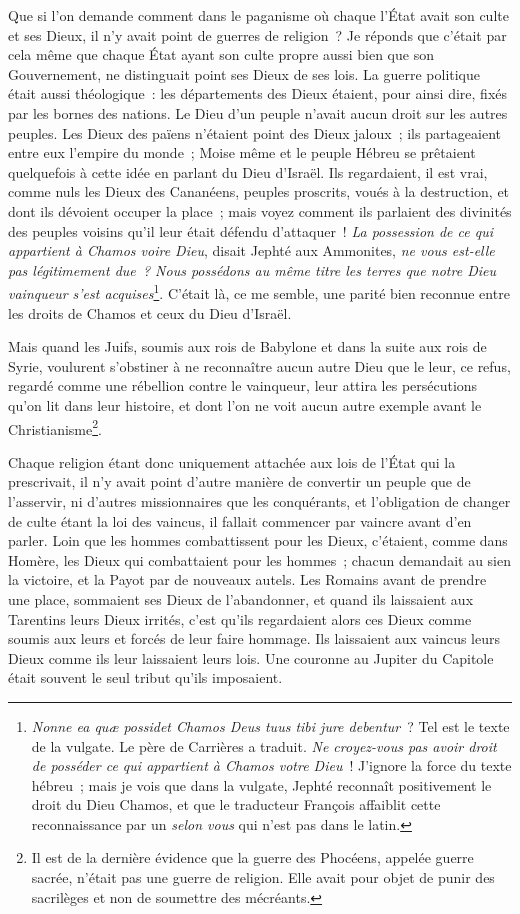 \documentclass[french,twoside]{book} %
\begin{document}
Que si l’on demande comment dans le paganisme où chaque l’État avait son culte et ses Dieux, il n’y avait point de guerres de religion ? Je réponds que c’était par cela même que chaque État ayant son culte propre aussi bien que son Gouvernement, ne distinguait point ses Dieux de ses lois. La guerre politique était aussi théologique : les départements des Dieux étaient, pour ainsi dire, fixés par les bornes des nations. Le Dieu d’un peuple n’avait aucun droit sur les autres peuples. Les Dieux des païens n’étaient point des Dieux jaloux ; ils partageaient entre eux l’empire du monde ; Moise même et le peuple Hébreu se prêtaient quelquefois à cette idée en parlant du Dieu d’Israël. Ils regardaient, il est vrai, comme nuls les Dieux des Cananéens, peuples proscrits, voués à la destruction, et dont ils dévoient occuper la place ; mais voyez comment ils parlaient des divinités des peuples voisins qu’il leur était défendu d’attaquer ! {\itshape La possession de ce qui appartient à Chamos voire Dieu}, disait Jephté aux Ammonites, {\itshape ne vous est-elle pas légitimement due ? Nous possédons au même titre les terres que notre Dieu vainqueur s’est acquises}\footnote{{\itshape Nonne ea quæ possidet Chamos Deus tuus tibi jure debentur} ? Tel est le texte de la vulgate. Le père de Carrières a traduit. {\itshape Ne croyez-vous pas avoir droit de posséder ce qui appartient à Chamos votre Dieu} ! J’ignore la force du texte hébreu ; mais je vois que dans la vulgate, Jephté reconnaît positivement le droit du Dieu Chamos, et que le traducteur François affaiblit cette reconnaissance par un {\itshape selon vous} qui n’est pas dans le latin.}. C’était là, ce me semble, une parité bien reconnue entre les droits de Chamos et ceux du Dieu d’Israël.\par
Mais quand les Juifs, soumis aux rois de Babylone et dans la suite aux rois de Syrie, voulurent s’obstiner à ne reconnaître aucun autre Dieu que le leur, ce refus, regardé comme une rébellion contre le vainqueur, leur attira les persécutions qu’on lit dans leur histoire, et dont l’on ne voit aucun autre exemple avant le Christianisme\footnote{Il est de la dernière évidence que la guerre des Phocéens, appelée guerre sacrée, n’était pas une guerre de religion. Elle avait pour objet de punir des sacrilèges et non de soumettre des mécréants.}.\par
Chaque religion étant donc uniquement attachée aux lois de l’État qui la prescrivait, il n’y avait point d’autre manière de convertir un peuple que de l’asservir, ni d’autres missionnaires que les conquérants, et l’obligation de changer de culte étant la loi des vaincus, il fallait commencer par vaincre avant d’en parler. Loin que les hommes combattissent pour les Dieux, c’étaient, comme dans Homère, les Dieux qui combattaient pour les hommes ; chacun demandait au sien la victoire, et la Payot par de nouveaux autels. Les Romains avant de prendre une place, sommaient ses Dieux de l’abandonner, et quand ils laissaient aux Tarentins leurs Dieux irrités, c’est qu’ils regardaient alors ces Dieux comme soumis aux leurs et forcés de leur faire hommage. Ils laissaient aux vaincus leurs Dieux comme ils leur laissaient leurs lois. Une couronne au Jupiter du Capitole était souvent le seul tribut qu’ils imposaient.\par
\end{document}
